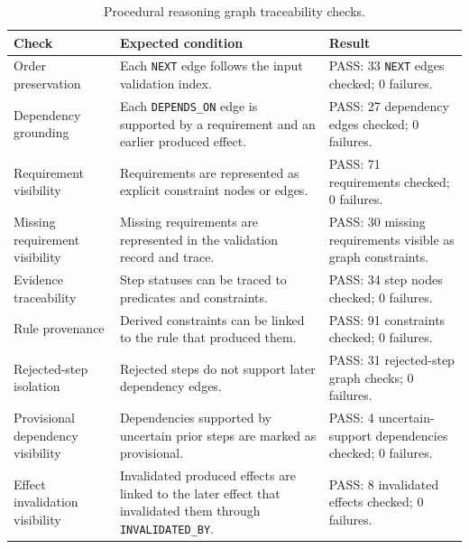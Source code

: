 \begin{table}[htbp]
\centering
\caption{Procedural reasoning graph traceability checks.}
\label{tab:evaluation-graph-traceability}
\small
\begin{tabular}{p{} p{} p{}}
\toprule
Check & Expected condition & Result \\
\midrule
Order preservation &
Each \texttt{NEXT} edge follows the input validation index. &
PASS: 33 \texttt{NEXT} edges checked; 0 failures. \\

Dependency grounding &
Each \texttt{DEPENDS\_ON} edge is supported by a requirement and an earlier produced effect. &
PASS: 27 dependency edges checked; 0 failures. \\

Requirement visibility &
Requirements are represented as explicit constraint nodes or edges. &
PASS: 71 requirements checked; 0 failures. \\

Missing requirement visibility &
Missing requirements are represented in the validation record and trace. &
PASS: 30 missing requirements visible as graph constraints. \\

Evidence traceability &
Step statuses can be traced to predicates and constraints. &
PASS: 34 step nodes checked; 0 failures. \\

Rule provenance &
Derived constraints can be linked to the rule that produced them. &
PASS: 91 constraints checked; 0 failures. \\

Rejected-step isolation &
Rejected steps do not support later dependency edges. &
PASS: 31 rejected-step graph checks; 0 failures. \\

Provisional dependency visibility &
Dependencies supported by uncertain prior steps are marked as provisional. &
PASS: 4 uncertain-support dependencies checked; 0 failures. \\

Effect invalidation visibility &
Invalidated produced effects are linked to the later effect that invalidated them through \texttt{INVALIDATED\_BY}. &
PASS: 8 invalidated effects checked; 0 failures. \\
\bottomrule
\end{tabular}
\end{table}

